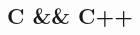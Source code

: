 \documentclass[12pt,a4paper]{article}
\begin{document}
\begin{CJK*}{UTF8}{gbsn}

\renewcommand{\abstractname}{摘要}
\newcommand{\HRule}{\rule{\linewidth}{0.5mm}}
\setcounter{tocdepth}{3}



\begin{spacing}{2.0}
\begin{abstract}
        
\end{abstract}
\end{spacing}

\begin{spacing}{2.0}
        \tableofcontents\clearpage
\end{spacing}

\begin{spacing}{1.8}
\section{C && C++}



\end{spacing}
\end{CJK*}
\end{document}
